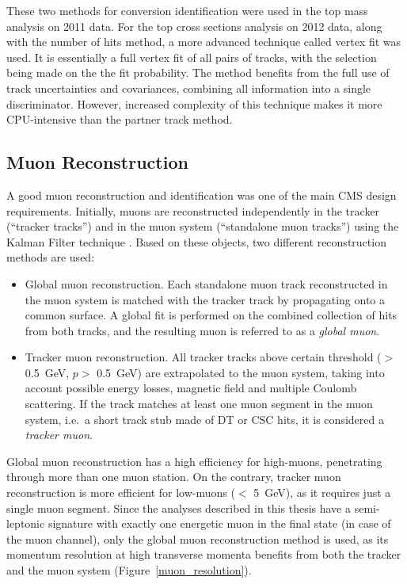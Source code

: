 These two methods for conversion identification were used in the top mass analysis on 2011 data. For the top cross
sections analysis on 2012 data, along with the number of hits method, a more advanced technique called vertex fit was
used. It is essentially a full vertex fit of all pairs of tracks, with the selection being made on the the fit
probability. The method benefits from the full use of track uncertainties and covariances, combining all information
into a single discriminator. However, increased complexity of this technique makes it more CPU-intensive than the
partner track method.


\subsection{Muon Reconstruction}
\label{ss:muon_reconstruction}
A good muon reconstruction and identification was one of the main CMS design requirements. Initially, muons are
reconstructed independently in the tracker (``tracker tracks'') and in the muon system (``standalone muon tracks'')
using the Kalman Filter technique \cite{KF}. Based on these objects, two different reconstruction methods are used:
\cite{muon_reconstruction}

\begin{itemize}
  \item Global muon reconstruction. Each standalone muon track reconstructed in the muon system is matched with the
  tracker track by propagating onto a common surface. A global fit is performed on the combined collection of hits from
  both tracks, and the resulting muon is referred to as a \textit{global muon}.
  \item Tracker muon reconstruction. All tracker tracks above certain threshold (\pt $>$ \SI{0.5}{\GeV}, $p >$
  \SI{0.5}{\GeV}) are extrapolated to the muon system, taking into account possible energy losses, magnetic field and
  multiple Coulomb scattering. If the track matches at least one muon segment in the muon system, i.e.\ a short track
  stub made of DT or CSC hits, it is considered a \textit{tracker muon}.
\end{itemize}

Global muon reconstruction has a high efficiency for high-\pt muons, penetrating through more than one muon station. On
the contrary, tracker muon reconstruction is more efficient for low-\pt muons (\pt $<$ \SI{5}{\GeV}), as it requires
just a single muon segment. Since the \ttbar analyses described in this thesis have a semi-leptonic signature with
exactly one energetic muon in the final state (in case of the muon channel), only the global muon reconstruction method
is used, as its momentum resolution at high transverse momenta benefits from both the tracker and the muon system
(Figure~\ref{muon_resolution}).

